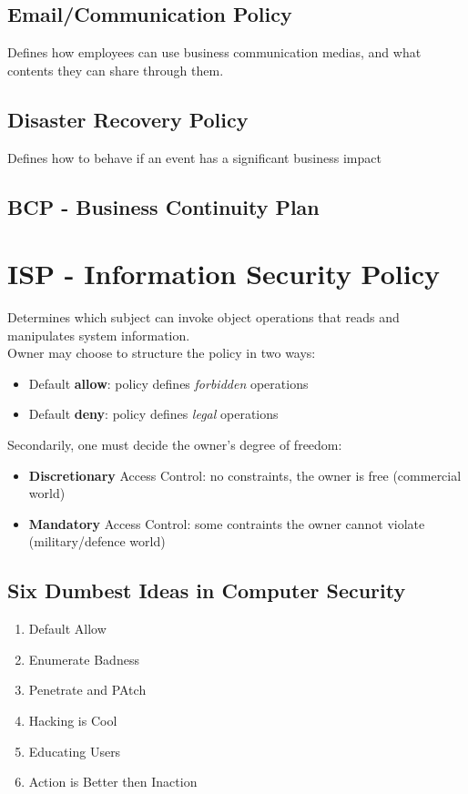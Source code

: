 \subsection{Email/Communication Policy}
Defines how employees can use business communication medias, and what contents they can share through them.
\subsection{Disaster Recovery Policy}
Defines how to behave if an event has a significant business impact
\subsection{BCP - Business Continuity Plan}


\section{ISP - Information Security Policy}
Determines which subject can invoke object operations that reads and manipulates system information.\\
Owner may choose to structure the policy in two ways:
\begin{itemize}
    \item Default \textbf{allow}: policy defines \textit{forbidden} operations
    \item Default \textbf{deny}: policy defines \textit{legal} operations
\end{itemize}
Secondarily, one must decide the owner's degree of freedom:
\begin{itemize}
    \item \textbf{Discretionary} Access Control: no constraints, the owner is free (commercial world)
    \item \textbf{Mandatory} Access Control: some contraints the owner cannot violate (military/defence world)
\end{itemize}

\subsection{Six Dumbest Ideas in Computer Security}
\begin{enumerate}
    \item Default Allow
    \item Enumerate Badness
    \item Penetrate and PAtch
    \item Hacking is Cool
    \item Educating Users
    \item Action is Better then Inaction
\end{enumerate}

